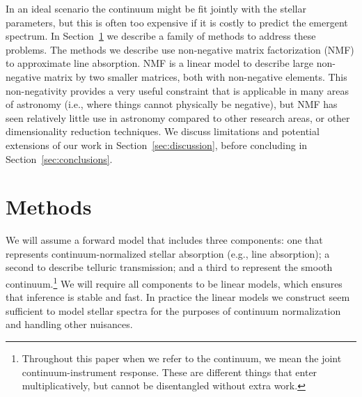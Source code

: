 \documentclass[modern]{aastex631}
\begin{document}
In an ideal scenario the continuum might be fit jointly with the stellar parameters, but this is often too expensive if it is costly to predict the emergent spectrum. In Section~\ref{sec:methods} we describe a family of methods to address these problems.
The methods we describe use non-negative matrix factorization (NMF) to approximate line absorption. NMF is a linear model to describe large non-negative matrix by two smaller matrices, both with non-negative elements. This non-negativity provides a very useful constraint that is applicable in many areas of astronomy (i.e., where things cannot physically be negative), but NMF has seen relatively little use in astronomy compared to other research areas, or other dimensionality reduction techniques.
We discuss limitations and potential extensions of our work in Section~\ref{sec:discussion}, before concluding in Section~\ref{sec:conclusions}.\\



\section{Methods}\label{sec:methods}

We will assume a forward model that includes three components: one that represents continuum-normalized stellar absorption (e.g., line absorption); a second to describe telluric transmission; and a third to represent the smooth continuum.\footnote{Throughout this paper when we refer to the continuum, we mean the joint continuum-instrument response. These are different things that enter multiplicatively, but cannot be disentangled without extra work.} We will require all components to be linear models, which ensures that inference is stable and fast. In practice the linear models we construct seem sufficient to model stellar spectra for the purposes of continuum normalization and handling other nuisances.\\

\end{document}
